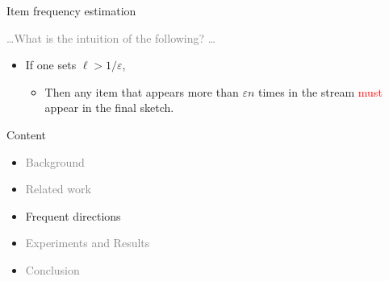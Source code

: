 \documentclass[first=dgreen,second=purple,logo=redque]{aaltoslides}
\begin{document}
\begin{frame}[allowframebreaks=1]{Item frequency estimation}
\framebreak


\textcolor{gray}{\ldots What is the intuition of the following? \ldots}

\begin{itemize}
  \item If one sets $\ell > 1/\varepsilon$,
  \begin{itemize} \item Then any item that appears \textcolor{dgreen}{more than}
  $\varepsilon n$ times in the stream \textcolor{red}{must} appear in
  the final sketch.\end{itemize}
\end{itemize}
 
\end{frame}


\begin{frame}{Content}
\begin{itemize}
\item \textcolor{gray}{Background}
\item \textcolor{gray}{Related work}
\item Frequent directions
\item \textcolor{gray}{Experiments and Results}
\item \textcolor{gray}{Conclusion}
\end{itemize}
\end{frame}

\end{document}
